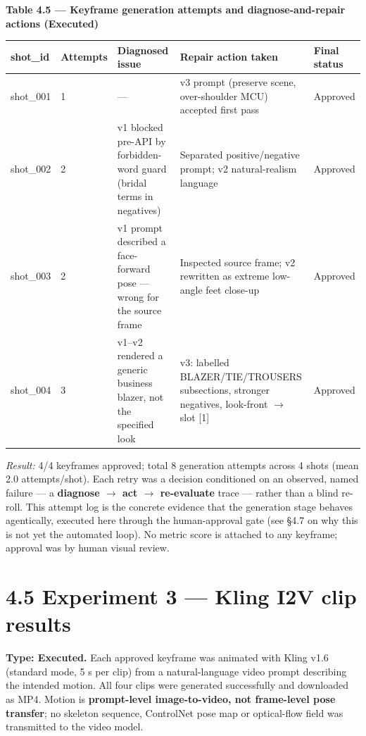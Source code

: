 \documentclass[10pt,twocolumn,letterpaper]{article}
\begin{document}
\begin{table}[t]
\centering
{\footnotesize\textbf{\textbf{Table 4.5 --- Keyframe generation attempts and diagnose-and-repair actions (Executed)}}}\par\vspace{3pt}
\footnotesize
\begin{tabularx}{\textwidth}{ll>{\RaggedRight\arraybackslash}X>{\RaggedRight\arraybackslash}Xl}
\toprule
shot\_id & Attempts & Diagnosed issue & Repair action taken & Final status \\
\midrule
shot\_001 & 1 & --- & v3 prompt (preserve scene, over-shoulder MCU) accepted first pass & Approved \\
shot\_002 & 2 & v1 blocked pre-API by forbidden-word guard (bridal terms in negatives) & Separated positive/negative prompt; v2 natural-realism language & Approved \\
shot\_003 & 2 & v1 prompt described a face-forward pose --- wrong for the source frame & Inspected source frame; v2 rewritten as extreme low-angle feet close-up & Approved \\
shot\_004 & 3 & v1--v2 rendered a generic business blazer, not the specified look & v3: labelled BLAZER/TIE/TROUSERS subsections, stronger negatives, look-front $\rightarrow$ slot [1] & Approved \\
\bottomrule
\end{tabularx}
\end{table}

\emph{Result:} 4/4 keyframes approved; total 8 generation attempts across 4 shots (mean 2.0 attempts/shot). Each retry was a decision conditioned on an observed, named failure --- a \textbf{diagnose $\rightarrow$ act $\rightarrow$ re-evaluate} trace --- rather than a blind re-roll. This attempt log is the concrete evidence that the generation stage behaves agentically, executed here through the human-approval gate (see \S{}4.7 on why this is not yet the automated loop). No metric score is attached to any keyframe; approval was by human visual review.


\section*{4.5 Experiment 3 --- Kling I2V clip results}

\textbf{Type: Executed.} Each approved keyframe was animated with Kling v1.6 (standard mode, 5 s per clip) from a natural-language video prompt describing the intended motion. All four clips were generated successfully and downloaded as MP4. Motion is \textbf{prompt-level image-to-video, not frame-level pose transfer}; no skeleton sequence, ControlNet pose map or optical-flow field was transmitted to the video model.
\end{document}
